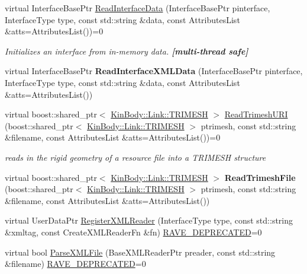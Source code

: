 \begin{DoxyCompactItemize}
\item 
virtual InterfaceBasePtr \hyperlink{classOpenRAVE_1_1EnvironmentBase_aceef6e28746bc88931aa1c863c9478f6}{ReadInterfaceData} (InterfaceBasePtr pinterface, InterfaceType type, const std::string \&data, const AttributesList \&atts=AttributesList())=0
\begin{DoxyCompactList}\small\item\em Initializes an interface from in-\/memory data. {\bfseries \mbox{[}multi-\/thread safe\mbox{]}} \item\end{DoxyCompactList}\item 
\hypertarget{classOpenRAVE_1_1EnvironmentBase_aeef0fe370eea0dc498db5116aac227af}{
virtual InterfaceBasePtr {\bfseries ReadInterfaceXMLData} (InterfaceBasePtr pinterface, InterfaceType type, const std::string \&data, const AttributesList \&atts=AttributesList())}
\label{classOpenRAVE_1_1EnvironmentBase_aeef0fe370eea0dc498db5116aac227af}

\item 
virtual boost::shared\_\-ptr$<$ \hyperlink{classOpenRAVE_1_1KinBody_1_1Link_1_1TRIMESH}{KinBody::Link::TRIMESH} $>$ \hyperlink{classOpenRAVE_1_1EnvironmentBase_ac12a12b9515823e2371cd4c04b201a6c}{ReadTrimeshURI} (boost::shared\_\-ptr$<$ \hyperlink{classOpenRAVE_1_1KinBody_1_1Link_1_1TRIMESH}{KinBody::Link::TRIMESH} $>$ ptrimesh, const std::string \&filename, const AttributesList \&atts=AttributesList())=0
\begin{DoxyCompactList}\small\item\em reads in the rigid geometry of a resource file into a TRIMESH structure \item\end{DoxyCompactList}\item 
\hypertarget{classOpenRAVE_1_1EnvironmentBase_ab7ec023d9a5f3435ee25f2be462d74c6}{
virtual boost::shared\_\-ptr$<$ \hyperlink{classOpenRAVE_1_1KinBody_1_1Link_1_1TRIMESH}{KinBody::Link::TRIMESH} $>$ {\bfseries ReadTrimeshFile} (boost::shared\_\-ptr$<$ \hyperlink{classOpenRAVE_1_1KinBody_1_1Link_1_1TRIMESH}{KinBody::Link::TRIMESH} $>$ ptrimesh, const std::string \&filename, const AttributesList \&atts=AttributesList())}
\label{classOpenRAVE_1_1EnvironmentBase_ab7ec023d9a5f3435ee25f2be462d74c6}

\item 
virtual UserDataPtr \hyperlink{classOpenRAVE_1_1EnvironmentBase_a15f83ec6ea57058090ca016f06e63870}{RegisterXMLReader} (InterfaceType type, const std::string \&xmltag, const CreateXMLReaderFn \&fn) \hyperlink{classOpenRAVE_1_1EnvironmentBase_acb298cf75a95a9dcfdc2bfccd7321413}{RAVE\_\-DEPRECATED}=0
\item 
\hypertarget{classOpenRAVE_1_1EnvironmentBase_a4a315546105f2114eb17188fd6cdcc93}{
virtual bool \hyperlink{classOpenRAVE_1_1EnvironmentBase_a4a315546105f2114eb17188fd6cdcc93}{ParseXMLFile} (BaseXMLReaderPtr preader, const std::string \&filename) \hyperlink{classOpenRAVE_1_1EnvironmentBase_acb298cf75a95a9dcfdc2bfccd7321413}{RAVE\_\-DEPRECATED}=0}
\label{classOpenRAVE_1_1EnvironmentBase_a4a315546105f2114eb17188fd6cdcc93}


\end{DoxyCompactItemize}
